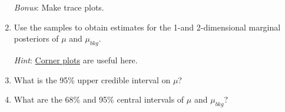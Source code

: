 \documentclass{article}
\begin{document}
\begin{enumerate}
    \textit{Bonus}: Make trace plots.

    \item Use the samples to obtain estimates for the 1-and 2-dimensional marginal posteriors of $\mu$ and $\mu_{bkg}$.

    \textit{Hint}: \href{https://corner.readthedocs.io/en/latest/}{Corner plots} are useful here.

    \item What is the 95\% upper credible interval on $\mu$?

    \item What are the 68\% and 95\% central intervals of $\mu$ and $\mu_{bkg}$?
    

\end{enumerate}
\end{document}
